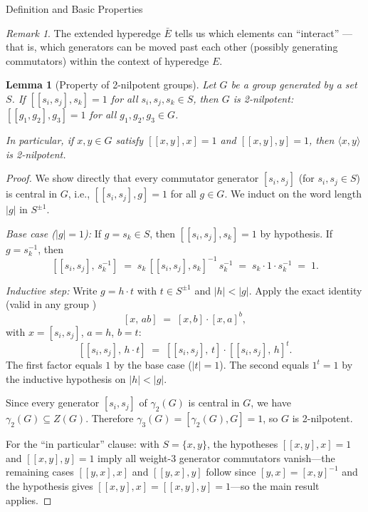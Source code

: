 \documentclass{article}
\newtheorem{lemma}[theorem]{Lemma}
\theoremstyle{definition}
\theoremstyle{remark}
\newtheorem{remark}[theorem]{Remark}
\theoremstyle{theorem}
\theoremstyle{definition}
\begin{document}
\begin{section}{Definition and Basic Properties}
\begin{remark}
The extended hyperedge $\bar{E}$ tells us which elements can ``interact'' --- that is, which generators can be moved past each other (possibly generating commutators) within the context of hyperedge $E$.
\end{remark}

\begin{lemma}[Property of 2-nilpotent groups]\label{lem:2nilpotent}
    Let $G$ be a group generated by a set $S$. If $[[s_i, s_j], s_k] = 1$
    for all $s_i, s_j, s_k \in S$, then $G$ is 2-nilpotent: $[[g_1,g_2],g_3]=1$
    for all $g_1,g_2,g_3 \in G$.

    In particular, if $x,y \in G$ satisfy $[[x,y],x]=1$ and $[[x,y],y]=1$,
    then $\langle x,y\rangle$ is 2-nilpotent.
\end{lemma}

\begin{proof}
    We show directly that every commutator generator $[s_i, s_j]$ (for
    $s_i, s_j \in S$) is central in $G$, i.e., $[[s_i, s_j], g] = 1$ for
    all $g \in G$. We induct on the word length $|g|$ in $S^{\pm 1}$.

    \textit{Base case ($|g|=1$):} If $g = s_k \in S$, then
    $[[s_i,s_j],s_k]=1$ by hypothesis. If $g = s_k^{-1}$, then
   $$[[s_i,s_j],\,s_k^{-1}] \;=\; s_k\,[[s_i,s_j],s_k]^{-1}\,s_k^{-1}
      \;=\; s_k \cdot 1 \cdot s_k^{-1} \;=\; 1.$$

    \textit{Inductive step:} Write $g = h \cdot t$ with $t \in S^{\pm 1}$
    and $|h| < |g|$. Apply the exact identity (valid in any group \cite{MKS})
    \begin{equation}\label{eq:exact_commutator}
      [x,\,ab] \;=\; [x,b]\cdot[x,a]^b,
    \end{equation}
    with $x=[s_i,s_j]$, $a=h$, $b=t$:
   $$[[s_i,s_j],\,h\cdot t] \;=\; [[s_i,s_j],\,t]\cdot[[s_i,s_j],\,h]^t.$$
    The first factor equals $1$ by the base case ($|t|=1$). The second
    equals $1^t = 1$ by the inductive hypothesis on $|h| < |g|$.

    Since every generator $[s_i,s_j]$ of $\gamma_2(G)$ is central in $G$,
    we have $\gamma_2(G)\subseteq Z(G)$. Therefore
    $\gamma_3(G)=[\gamma_2(G),G]=1$, so $G$ is 2-nilpotent.

    For the ``in particular'' clause: with $S=\{x,y\}$, the hypotheses
    $[[x,y],x]=1$ and $[[x,y],y]=1$ imply all weight-3 generator
    commutators vanish---the remaining cases $[[y,x],x]$ and $[[y,x],y]$
    follow since $[y,x]=[x,y]^{-1}$ and the hypothesis gives
    $[[x,y],x]=[[x,y],y]=1$---so the main result applies.
\end{proof}


\end{section}
\end{document}
